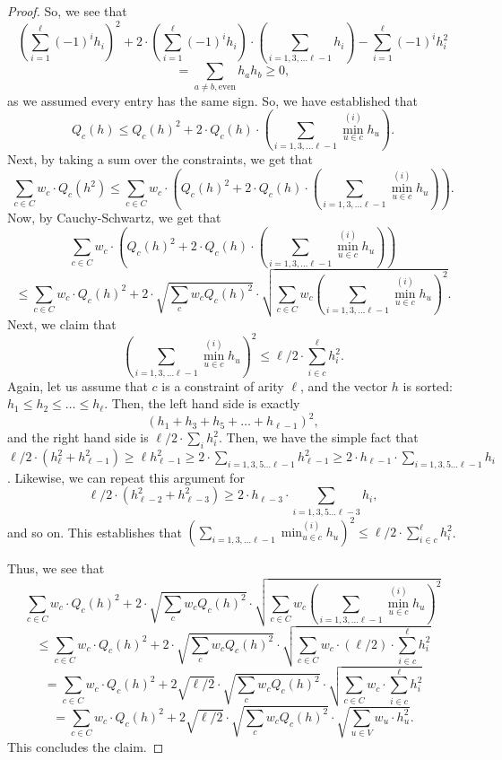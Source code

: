 \documentclass[11pt]{article}
\theoremstyle{definition}
\begin{document}
\begin{proof}
    So, we see that 
    \[
    \left ( \sum_{i = 1}^{\ell} (-1)^i h_i \right )^2 + 2 \cdot \left ( \sum_{i = 1}^{\ell} (-1)^i h_i \right ) \cdot \left ( \sum_{i = 1, 3, \dots \ell-1} h_i \right ) - \sum_{i = 1}^{\ell} (-1)^i h_i^2
    \]
    \[
    = \sum_{a \neq b, \text{even}} h_a h_b \geq 0,
    \]
    as we assumed every entry has the same sign. So, we have established that 
    \[
    Q_c(h) \leq Q_c(h)^2 + 2 \cdot Q_c(h) \cdot \left ( \sum_{i = 1, 3, \dots \ell -1} \min^{(i)}_{u \in c} h_u \right ) .
    \]
    Next, by taking a sum over the constraints, we get that 
    \[
    \sum_{c \in C} w_c \cdot Q_c(h^2) \leq \sum_{c \in C} w_c \cdot\left ( Q_c(h)^2 + 2 \cdot Q_c(h) \cdot \left ( \sum_{i = 1, 3, \dots \ell -1} \min^{(i)}_{u \in c} h_u \right )   \right ).
    \]
    Now, by Cauchy-Schwartz, we get that 
    \[
    \sum_{c \in C} w_c \cdot \left ( Q_c(h)^2 + 2 \cdot Q_c(h) \cdot \left ( \sum_{i = 1, 3, \dots \ell -1} \min^{(i)}_{u \in c} h_u \right )   \right )
    \]
    \[
    \leq  \sum_{c \in C} w_c \cdot Q_c(h)^2 + 2 \cdot \sqrt{\sum_c w_c Q_c(h)^2} \cdot \sqrt{\sum_{c \in C} w_c \left ( \sum_{i = 1, 3, \dots \ell -1} \min^{(i)}_{u \in c} h_u \right )^2}.
    \]
    Next, we claim that 
    \[
    \left ( \sum_{i = 1, 3, \dots \ell -1}\min^{(i)}_{u \in c} h_u \right )^2 \leq \ell/2 \cdot \sum_{i \in c}^{\ell} h_i^2. 
    \]
    Again, let us assume that $c$ is a constraint of arity $\ell$, and the vector $h$ is sorted: $h_1 \leq h_2 \leq \dots \leq h_{\ell}$. Then, the left hand side is exactly 
    \[
    (h_1 + h_3 + h_5 + \dots + h_{\ell-1})^2,
    \]
    and the right hand side is $\ell/2 \cdot \sum_i h_i^2$. Then, we have the simple fact that $\ell/2 \cdot (h_{\ell}^2 + h_{\ell-1}^2) \geq \ell h_{\ell-1}^2 \geq 2 \cdot \sum_{i = 1, 3, 5 \dots \ell-1} h_{\ell-1}^2 \geq 2 \cdot h_{\ell-1} \cdot \sum_{i = 1, 3, 5 \dots \ell-1} h_{i}$. Likewise, we can repeat this argument for 
    \[
    \ell/2 \cdot (h_{\ell-2}^2 + h_{\ell-3}^2) \geq 2 \cdot h_{\ell-3} \cdot \sum_{i = 1, 3, 5 \dots \ell-3} h_{i},
    \]
    and so on. This establishes that $\left ( \sum_{i = 1, 3, \dots \ell -1}\min^{(i)}_{u \in c} h_u \right )^2 \leq \ell/2 \cdot \sum_{i \in c}^{\ell} h_i^2$.

    Thus, we see that 
    \[
    \sum_{c \in C} w_c \cdot  Q_c(h)^2 + 2 \cdot \sqrt{\sum_c w_c Q_c(h)^2} \cdot \sqrt{\sum_{c \in C} w_c \left ( \sum_{i = 1, 3, \dots \ell -1} \min^{(i)}_{u \in c} h_u \right )^2} 
    \]
    \[
    \leq  \sum_{c \in C}  w_c \cdot Q_c(h)^2 + 2 \cdot \sqrt{\sum_c w_c Q_c(h)^2} \cdot \sqrt{\sum_{c \in C} w_c\cdot  (\ell/2) \cdot \sum_{i \in c}^{\ell} h_i^2}
    \]
    \[
    = \sum_{c \in C} w_c \cdot Q_c(h)^2 + 2 \sqrt{\ell/2} \cdot \sqrt{\sum_c w_c Q_c(h)^2} \cdot \sqrt{\sum_{c \in C} w_c \cdot \sum_{i \in c}^{\ell} h_i^2}
    \]
    \[
    = \sum_{c \in C} w_c \cdot  Q_c(h)^2 + 2 \sqrt{\ell/2} \cdot \sqrt{\sum_c w_c Q_c(h)^2} \cdot \sqrt{\sum_{u \in V} w_u \cdot h_u^2}.
    \]
    This concludes the claim. 
\end{proof}
\end{document}
